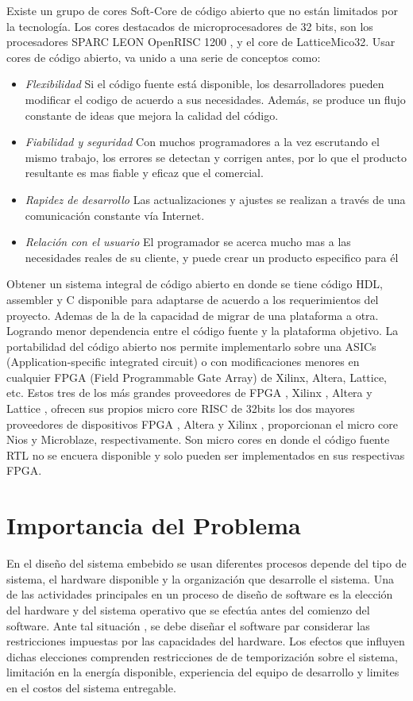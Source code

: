Existe un grupo de cores Soft-Core de código abierto que no están limitados por la tecnología. Los cores destacados de microprocesadores de 32 bits,
son los procesadores SPARC LEON OpenRISC 1200 , y el core de LatticeMico32. Usar cores de  código abierto,  va unido a una serie de conceptos como:
 \begin {itemize}
\item
\textit{Flexibilidad}  Si el código fuente está disponible, los desarrolladores pueden modificar el codigo de acuerdo a sus necesidades. Además, se
produce un flujo constante de ideas que mejora la calidad del código.
\item 
\textit{Fiabilidad y seguridad}  Con muchos programadores a la vez escrutando el mismo trabajo, los errores se detectan y corrigen antes, por lo que
el producto resultante es mas fiable y eficaz que el comercial.
\item 
\textit{Rapidez de desarrollo}  Las actualizaciones y ajustes se realizan a través de una comunicación constante vía Internet.
\item 
\textit{Relación con el usuario} El programador se acerca mucho mas a las necesidades reales de su cliente, y puede crear un producto especifico para
él
 \end {itemize}
 
Obtener un sistema integral de código abierto en donde se tiene código HDL, assembler y C disponible para adaptarse de acuerdo a los requerimientos del proyecto. Ademas de la de la capacidad de migrar de una plataforma a otra. Logrando menor dependencia entre el código fuente y la plataforma objetivo. 
La portabilidad del código abierto nos permite implementarlo sobre una ASICs (Application-specific integrated circuit) o con modificaciones menores en cualquier FPGA (Field Programmable Gate Array) de Xilinx, Altera, Lattice, etc. 
Estos tres de los más grandes proveedores de FPGA , Xilinx , Altera y Lattice , ofrecen sus propios micro core RISC de 32bits los dos mayores proveedores de dispositivos FPGA , Altera y Xilinx , proporcionan el micro core Nios y Microblaze, respectivamente. Son micro cores  en donde el código fuente RTL no se encuera disponible y solo pueden ser implementados en sus respectivas FPGA.

\section{Importancia del Problema}

En el diseño del sistema embebido se usan diferentes procesos depende del tipo de sistema, el hardware disponible y la organización que desarrolle el sistema. Una de las actividades principales en un proceso de diseño de software es la elección del hardware y del sistema operativo que se efectúa antes del comienzo del software. Ante tal situación , se debe diseñar el software par considerar las restricciones impuestas por las capacidades del hardware.
Los efectos que influyen dichas elecciones comprenden restricciones de de temporización sobre el sistema, limitación en la energía disponible, experiencia del equipo de desarrollo y limites en el costos del sistema entregable.
 
